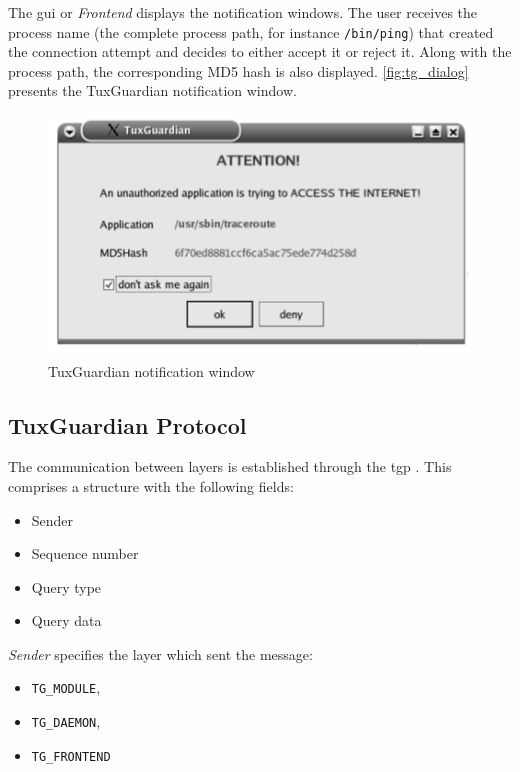The \gls{gui} or \textit{Frontend} displays the notification windows. The user receives the process name (the complete process path, for instance \texttt{/bin/ping}) that created the connection attempt and decides to either accept it or reject it. Along with the process path, the corresponding MD5 hash is also displayed. \autoref{fig:tg_dialog} presents the TuxGuardian notification window.

\begin{figure}[h]
 \begin{center}
 \includegraphics[scale=0.5]{figures/tg_dialog.png}
 \end{center}
 \caption{TuxGuardian notification window}
 \label{fig:tg_dialog}
\end{figure}

\subsection{TuxGuardian Protocol}

The communication between layers is established through the \gls{tgp} \cite{Report:TuxGuardian}. This comprises a structure with the following fields:

\begin{itemize}
\item Sender
\item Sequence number
\item Query type
\item Query data
\end{itemize}

\textit{Sender} specifies the layer which sent the message: 

\begin{itemize}
\item \texttt{TG\_MODULE},
\item \texttt{TG\_DAEMON},
\item  \texttt{TG\_FRONTEND}
\end{itemize}


